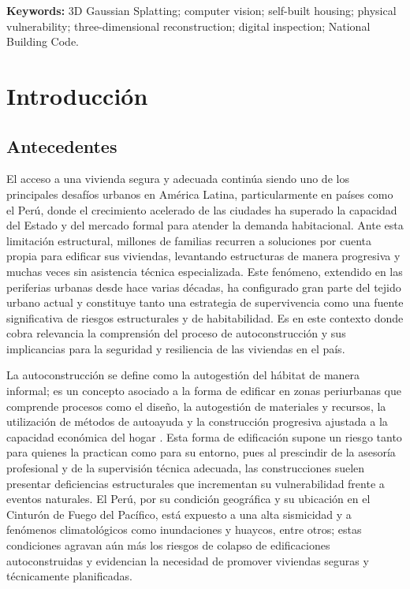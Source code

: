 \documentclass[12pt,oneside]{report}
\begin{document}
\textbf{Keywords:} 3D Gaussian Splatting; computer vision; self-built housing; physical vulnerability; three-dimensional reconstruction; digital inspection; National Building Code.

\tableofcontents
\listoffigures
\listoftables

\clearpage
{}

\chapter{Introducción}

\section{Antecedentes}
El acceso a una vivienda segura y adecuada continúa siendo uno de los principales desafíos urbanos en América Latina, particularmente en países como el Perú, donde el crecimiento acelerado de las ciudades ha superado la capacidad del Estado y del mercado formal para atender la demanda habitacional. Ante esta limitación estructural, millones de familias recurren a soluciones por cuenta propia para edificar sus viviendas, levantando estructuras de manera progresiva y muchas veces sin asistencia técnica especializada. Este fenómeno, extendido en las periferias urbanas desde hace varias décadas, ha configurado gran parte del tejido urbano actual y constituye tanto una estrategia de supervivencia como una fuente significativa de riesgos estructurales y de habitabilidad. Es en este contexto donde cobra relevancia la comprensión del proceso de autoconstrucción y sus implicancias para la seguridad y resiliencia de las viviendas en el país.\par

La autoconstrucción se define como la autogestión del hábitat de manera informal; es un concepto asociado a la forma de edificar en zonas periurbanas que comprende procesos como el diseño, la autogestión de materiales y recursos, la utilización de métodos de autoayuda y la construcción progresiva ajustada a la capacidad económica del hogar \citep{castro2024}. Esta forma de edificación supone un riesgo tanto para quienes la practican como para su entorno, pues al prescindir de la asesoría profesional y de la supervisión técnica adecuada, las construcciones suelen presentar deficiencias estructurales que incrementan su vulnerabilidad frente a eventos naturales. El Perú, por su condición geográfica y su ubicación en el Cinturón de Fuego del Pacífico, está expuesto a una alta sismicidad y a fenómenos climatológicos como inundaciones y huaycos, entre otros; estas condiciones agravan aún más los riesgos de colapso de edificaciones autoconstruidas y evidencian la necesidad de promover viviendas seguras y técnicamente planificadas. \par
\end{document}
